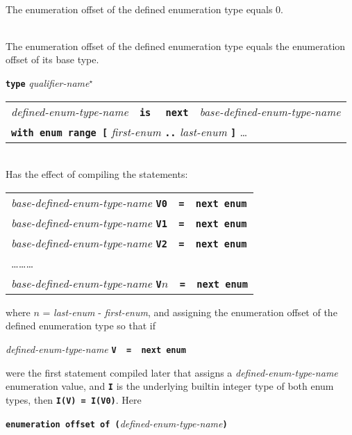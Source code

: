 \documentclass[12pt]{article}
\newcommand{\TT}[1]{{\tt \bfseries #1}}
\newcommand{\STAR}{{\Large $^\star$}}
\newenvironment{indpar}[1][0.3in]%
	{\begin{list}{}%
		     {\setlength{\itemsep}{0in}%
		      \setlength{\topsep}{0in}%
		      \setlength{\parsep}{1ex}%
		      \setlength{\labelwidth}{#1}%
		      \setlength{\leftmargin}{#1}%
		      \addtolength{\leftmargin}{\labelsep}}%
	 \item}%
	{\end{list}}
\newenvironment{itemlist}[1][0.5in]%
	{\begin{list}{}{\setlength{\labelwidth}{#1}%
	                \setlength{\leftmargin}{#1}%
		        \addtolength{\leftmargin}{\labelsep}}}%
	{\end{list}}
\begin{document}
\begin{indpar}
\begin{itemlist}
\item[\TT{type} {\em qualifier-name}\STAR{} {\em defined-enum-type-name}~~%
    \TT{is}~~{\em builtin-integer-type-name} \ldots{}] ~\\
The enumeration offset of the defined enumeration type equals 0.
\item[\TT{type} {\em qualifier-name}\STAR{} {\em defined-enum-type-name}~~%
    \TT{is}~~{\em non-builtin-integer-type-name} \ldots{}] ~\\
The enumeration offset of the defined enumeration type equals
the enumeration offset of its base type.
\item[\TT{type} {\em qualifier-name}\STAR{}]
              \begin{tabular}[t]{@{}l@{}}
              {\em defined-enum-type-name}~~\TT{is}~~%
              \TT{next}~~{\em base-defined-enum-type-name} \\
	      \TT{with enum range [}
	         {\em first-enum} \TT{..} {\em last-enum} \TT{]} \ldots{} \\
	      \end{tabular} \\
Has the effect of compiling the statements:
\begin{center}
\begin{tabular}{l}
{\em base-defined-enum-type-name} \TT{V0~~=~~next enum} \\
{\em base-defined-enum-type-name} \TT{V1~~=~~next enum} \\
{\em base-defined-enum-type-name} \TT{V2~~=~~next enum} \\
\ldots\ldots\ldots \\
{\em base-defined-enum-type-name} \TT{V$n$~~=~~next enum} \\
\end{tabular}
\end{center}
where $n$ = {\em last-enum} - {\em first-enum}, and assigning
the enumeration offset of the defined enumeration type so that if
\begin{center}
{\em defined-enum-type-name} \TT{V~~=~~next enum} \\
\end{center}
were the first statement compiled later that assigns a
{\em defined-enum-type-name} enumeration value,
and \TT{I} is the underlying builtin integer type of both enum
types, then \TT{I(V) = I(V0)}.  Here
\begin{center}
\TT{enumeration offset of (}{\em defined-enum-type-name}\TT{)} \\

\end{center}
\end{itemlist}
\end{indpar}
\end{document}
